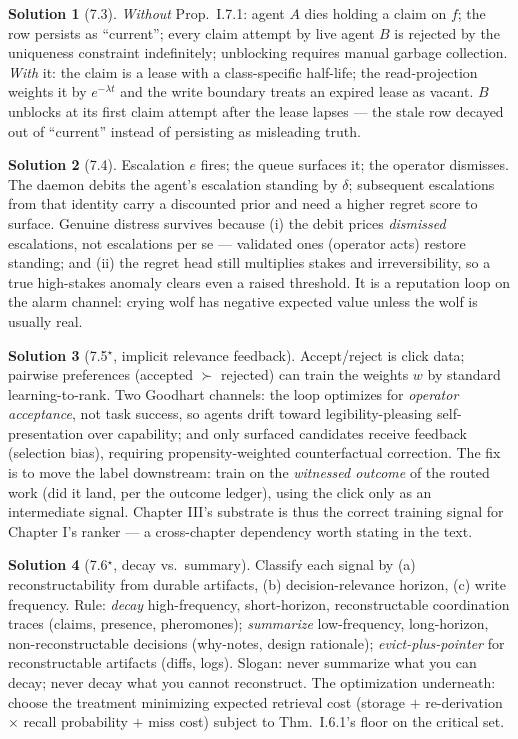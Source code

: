 \documentclass[11pt,a4paper]{article}
\theoremstyle{definition}
\newtheorem{sol}{Solution}
\theoremstyle{remark}
\begin{document}
\begin{sol}[7.3]
\emph{Without} Prop.~I.7.1: agent $A$ dies holding a claim on $f$; the row persists as ``current''; every claim attempt by live agent $B$ is rejected by the uniqueness constraint indefinitely; unblocking requires manual garbage collection. \emph{With} it: the claim is a lease with a class-specific half-life; the read-projection weights it by $e^{-\lambda t}$ and the write boundary treats an expired lease as vacant. $B$ unblocks at its first claim attempt after the lease lapses --- the stale row decayed out of ``current'' instead of persisting as misleading truth.
\end{sol}

\begin{sol}[7.4]
Escalation $e$ fires; the queue surfaces it; the operator dismisses. The daemon debits the agent's escalation standing by $\delta$; subsequent escalations from that identity carry a discounted prior and need a higher regret score to surface. Genuine distress survives because (i) the debit prices \emph{dismissed} escalations, not escalations per se --- validated ones (operator acts) restore standing; and (ii) the regret head still multiplies stakes and irreversibility, so a true high-stakes anomaly clears even a raised threshold. It is a reputation loop on the alarm channel: crying wolf has negative expected value unless the wolf is usually real.
\end{sol}

\begin{sol}[7.5$^\star$, implicit relevance feedback]
Accept/reject is click data; pairwise preferences (accepted $\succ$ rejected) can train the weights $w$ by standard learning-to-rank. Two Goodhart channels: the loop optimizes for \emph{operator acceptance}, not task success, so agents drift toward legibility-pleasing self-presentation over capability; and only surfaced candidates receive feedback (selection bias), requiring propensity-weighted counterfactual correction. The fix is to move the label downstream: train on the \emph{witnessed outcome} of the routed work (did it land, per the outcome ledger), using the click only as an intermediate signal. Chapter III's substrate is thus the correct training signal for Chapter I's ranker --- a cross-chapter dependency worth stating in the text.
\end{sol}

\begin{sol}[7.6$^\star$, decay vs.\ summary]
Classify each signal by (a) reconstructability from durable artifacts, (b) decision-relevance horizon, (c) write frequency. Rule: \emph{decay} high-frequency, short-horizon, reconstructable coordination traces (claims, presence, pheromones); \emph{summarize} low-frequency, long-horizon, non-reconstructable decisions (why-notes, design rationale); \emph{evict-plus-pointer} for reconstructable artifacts (diffs, logs). Slogan: never summarize what you can decay; never decay what you cannot reconstruct. The optimization underneath: choose the treatment minimizing expected retrieval cost (storage $+$ re-derivation $\times$ recall probability $+$ miss cost) subject to Thm.~I.6.1's floor on the critical set.
\end{sol}
\end{document}
